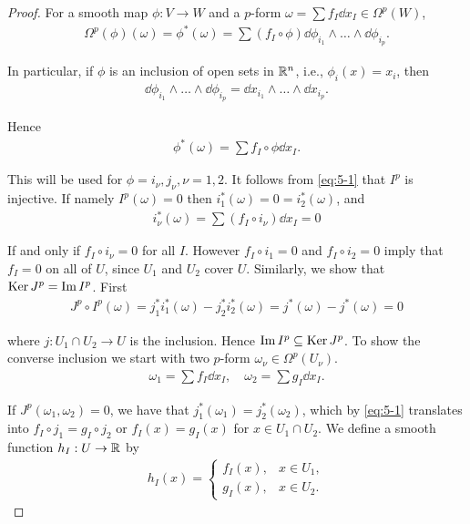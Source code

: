 \begin{proof}
  For a smooth map $\phi:V\to W$ and a $p$-form $\omega = \sum f_I\dd x_I\in \Omega^p(W)$,
  \begin{align*}
    \Omega^p(\phi)(\omega)=\phi^*(\omega)=\sum (f_I\circ\phi)\dd\phi_{i_1}\wedge\ldots\wedge\dd\phi_{i_p}.    
  \end{align*}

  In particular, if $\phi$ is an inclusion of open sets in ${\mathbb{R}}^n$, i.e., $\phi_i(x) = x_i$, then 
  \begin{align*}
    \dd \phi_{i_1}\wedge\ldots\wedge\dd\phi_{i_p} = \dd x_{i_1}\wedge\ldots\wedge\dd x_{i_p}.  
  \end{align*}

  Hence 
  \begin{align}\label{eq:5-1}
    \phi^*(\omega) = \sum f_I\circ\phi\dd x_I.
  \end{align}

  This will be used for $\phi = i_\nu, j_\nu, \nu=1, 2$. It follows from \eqref{eq:5-1} that $I^p$ is injective.
  If namely $I^p(\omega) = 0$ then $i^*_1(\omega) = 0 = i^*_2(\omega)$, and 
  \begin{align*}
    i_\nu^*(\omega) = \sum (f_I\circ i_\nu)\dd x_I = 0
  \end{align*}

  If and only if $f_I\circ i_\nu = 0$ for all $I$. However $f_I\circ i_1 = 0$ and $f_I\circ i_2 = 0$ imply that
  $f_I = 0$ on all of $U$, since $U_1$ and $U_2$ cover $U$. Similarly, we show that $\operatorname{Ker} J^p = \operatorname{Im} I^p$. First 
  \begin{align*}
    J^p\circ I^p(\omega) 
    = j^*_1i^*_1(\omega) - j^*_2i^*_2(\omega) 
    = j^*(\omega) - j^*(\omega) 
    = 0
  \end{align*}

  where $j:U_1\cap U_2 \to U$ is the inclusion. Hence $\operatorname{Im} I^p \subseteq \operatorname{Ker} J^p$. To show the converse inclusion 
  we start with two $p$-form $\omega_\nu\in \Omega^p(U_\nu)$.
  \begin{align*}
    \omega_1 = \sum f_I\dd x_I, \quad \omega_2 = \sum g_I\dd x_I.
  \end{align*}

  If $J^p(\omega_1,\omega_2)=0$, we have that $j_1^*(\omega_1) = j^*_2(\omega_2)$, which by 
  \eqref{eq:5-1} translates into $f_I\circ j_1 = g_I\circ j_2$ or $f_I(x) = g_I(x)$ for $x\in U_1\cap U_2$. We define 
  a smooth function $h_I:U\to {\ensuremath{\mathbb{R}}}$ by
  \begin{align*}
    h_I(x) = \begin{cases}
      f_I(x), & x\in U_1,\\
      g_I(x), & x\in U_2.
    \end{cases}  
  \end{align*}
  

\end{proof}
